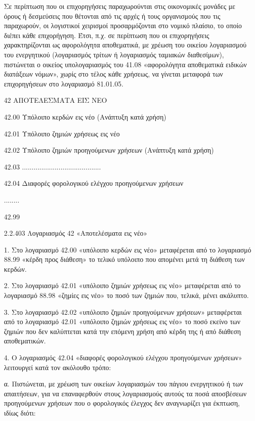 \documentclass[A4,10pt,greek]{book}
\begin{document}
Σε περίπτωση που οι επιχορηγήσεις παραχωρούνται στις οικονομικές μονάδες με όρους ή δεσμεύσεις που θέτονται από τις αρχές ή τους οργανισμούς που τις παραχωρούν, οι λογιστικοί χειρισμοί προσαρμόζονται στο νομικό πλαίσιο, το οποίο διέπει κάθε επιχορήγηση. Έτσι, π.χ. σε περίπτωση που οι επιχορηγήσεις χαρακτηρίζονται ως αφορολόγητα αποθεματικά, με χρέωση του οικείου λογαριασμού του ενεργητικού (λογαριασμός τρίτων ή λογαριασμός ταμιακών διαθεσίμων), πιστώνεται ο οικείος υπολογαριασμός του 41.08 «αφορολόγητα αποθεματικά ειδικών διατάξεων νόμων», χωρίς στο τέλος κάθε χρήσεως, να γίνεται μεταφορά των επιχορηγήσεων στο λογαριασμό 81.01.05.

 42   ΑΠΟΤΕΛΕΣΜΑΤΑ ΕΙΣ ΝΕΟ 

        42.00   Υπόλοιπο κερδών εις νέο
                    (Ανάπτυξη κατά χρήση)

        42.01   Υπόλοιπο ζημιών χρήσεως εις νέο 

        42.02   Υπόλοιπο ζημιών προηγούμενων χρήσεων
                    (Ανάπτυξη κατά χρήση)

        42.03   .........................................

        42.04   Διαφορές φορολογικού ελέγχου προηγούμενων χρήσεων

        ........

        42.99

2.2.403 Λογαριασμός 42 «Αποτελέσματα εις νέο»

1. Στο λογαριασμό 42.00 «υπόλοιπο κερδών εις νέο» μεταφέρεται από το λογαριασμό 88.99 «κέρδη προς διάθεση» το τελικό υπόλοιπο που απομένει μετά τη διάθεση των κερδών.

2. Στο λογαριασμό 42.01 «υπόλοιπο ζημιών χρήσεως εις νέο» μεταφέρεται από το λογαριασμό 88.98 «ζημίες εις νέο» το ποσό των ζημιών που, τελικά, μένει ακάλυπτο.

3. Στο λογαριασμό 42.02 «υπόλοιπο ζημιών προηγούμενων χρήσεων» μεταφέρεται από το λογαριασμό 42.01 «υπόλοιπο ζημιών χρήσεως εις νέο» το ποσό εκείνο των ζημιών που δεν καλύπτεται κατά την επόμενη χρήση από κέρδη της ή από διάθεση αποθεματικών.

4. Ο λογαριασμός 42.04 «διαφορές φορολογικού ελέγχου προηγούμενων χρήσεων» λειτουργεί κατά τον ακόλουθο τρόπο:

α. Πιστώνεται, με χρέωση των οικείων λογαριασμών του πάγιου ενεργητικού ή των απαιτήσεων, για να επαναφερθούν στους λογαριασμούς αυτούς τα ποσά αποσβέσεων προηγούμενων χρήσεων που ο φορολογικός έλεγχος δεν αναγνωρίζει για έκπτωση, ιδίως διότι:
\end{document}

